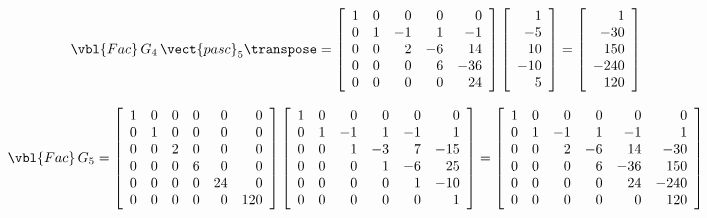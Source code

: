 \[
 \vbl{Fac}\,G_4\,\vect{pasc}_5\transpose =
 \left[\begin{array}{rrrrr}
   1 & 0 &  0 &  0 &   0 \\
   0 & 1 & -1 &  1 &  -1 \\
   0 & 0 &  2 & -6 &  14 \\
   0 & 0 &  0 &  6 & -36 \\
   0 & 0 &  0 &  0 &  24 \\
 \end{array}\right]
 \left[\begin{array}{r}
   1 \\ -5 \\ 10 \\ -10 \\ 5 \\
 \end{array}\right]
 =
 \left[\begin{array}{r}
   1 \\ -30 \\ 150 \\ -240  \\ 120 \\
 \end{array}\right]
\]

\[
 \vbl{Fac}\,G_5 =
 \left[\begin{array}{rrrrrr}
   1 & 0 & 0 & 0 &  0 &   0 \\
   0 & 1 & 0 & 0 &  0 &   0 \\
   0 & 0 & 2 & 0 &  0 &   0 \\
   0 & 0 & 0 & 6 &  0 &   0 \\
   0 & 0 & 0 & 0 & 24 &   0 \\
   0 & 0 & 0 & 0 &  0 & 120 \\
 \end{array}\right]
 \left[\begin{array}{rrrrrr}
   1 & 0 &  0 &  0 &  0 &   0 \\
   0 & 1 & -1 &  1 & -1 &   1 \\
   0 & 0 &  1 & -3 &  7 & -15 \\
   0 & 0 &  0 &  1 & -6 &  25 \\
   0 & 0 &  0 &  0 &  1 & -10 \\
   0 & 0 &  0 &  0 &  0 &   1 \\
 \end{array}\right]
 =
 \left[\begin{array}{rrrrrr}
   1 & 0 &  0 &  0 &   0 &    0 \\
   0 & 1 & -1 &  1 &  -1 &    1 \\
   0 & 0 &  2 & -6 &  14 &  -30 \\
   0 & 0 &  0 &  6 & -36 &  150 \\
   0 & 0 &  0 &  0 &  24 & -240 \\
   0 & 0 &  0 &  0 &  0  &  120 \\
 \end{array}\right]
\]

